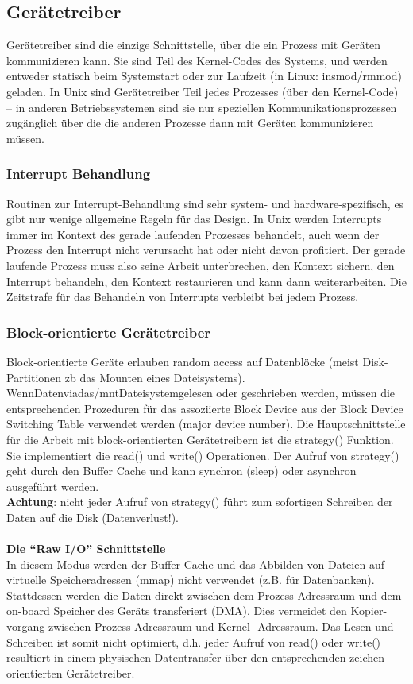 \documentclass[a4paper, 10pt]{article}
\newcommand{\Bold}[1]{\textbf{#1}} %
\begin{document}
\subsection{Gerätetreiber}
Gerätetreiber sind die einzige Schnittstelle, über die ein Prozess mit Geräten kommunizieren kann. Sie sind Teil des Kernel-Codes des Systems, und werden entweder statisch beim Systemstart oder zur Laufzeit (in Linux: insmod/rmmod) geladen. In Unix sind Gerätetreiber Teil jedes Prozesses (über den Kernel-Code) – in anderen Betriebssystemen sind sie nur speziellen Kommunikationsprozessen zugänglich über die die anderen Prozesse dann mit Geräten kommunizieren müssen.
\subsubsection{Interrupt Behandlung}
Routinen zur Interrupt-Behandlung sind sehr system- und hardware-spezifisch, es gibt nur wenige allgemeine Regeln für das Design. In Unix werden Interrupts immer im Kontext des gerade laufenden Prozesses behandelt, auch wenn der Prozess den Interrupt nicht verursacht hat oder nicht davon profitiert. Der gerade laufende Prozess muss also seine Arbeit unterbrechen, den Kontext sichern, den Interrupt behandeln, den Kontext restaurieren und kann dann weiterarbeiten. Die Zeitstrafe für das Behandeln von Interrupts verbleibt bei jedem Prozess.

\subsubsection{Block-orientierte Gerätetreiber}
Block-orientierte Geräte erlauben random access auf Datenblöcke (meist Disk-Partitionen zb das Mounten eines Dateisystems).	WennDatenviadas/mntDateisystemgelesen oder geschrieben werden, müssen die entsprechenden Prozeduren für das assoziierte Block Device aus der Block Device Switching Table verwendet werden (major device number). Die Hauptschnittstelle für die Arbeit mit block-orientierten Gerätetreibern ist die strategy() Funktion. Sie implementiert die read() und write() Operationen. Der Aufruf von strategy() geht durch den Buffer Cache und kann synchron (sleep) oder asynchron ausgeführt werden. \\
\Bold {Achtung}: nicht jeder Aufruf von strategy() führt zum sofortigen Schreiben der Daten auf die Disk (Datenverlust!). \\ \\
\Bold {Die “Raw I/O” Schnittstelle}\\
In diesem Modus werden der Buffer Cache und das Abbilden von Dateien auf virtuelle Speicheradressen (mmap) nicht verwendet (z.B. für Datenbanken). Stattdessen werden die Daten direkt zwischen dem Prozess-Adressraum und dem on-board Speicher des Geräts transferiert (DMA). Dies vermeidet den Kopier- vorgang zwischen Prozess-Adressraum und Kernel- Adressraum. Das Lesen und Schreiben ist somit nicht optimiert, d.h. jeder Aufruf von read() oder write() resultiert in
einem physischen Datentransfer über den entsprechenden zeichen-orientierten Gerätetreiber.
\end{document}
